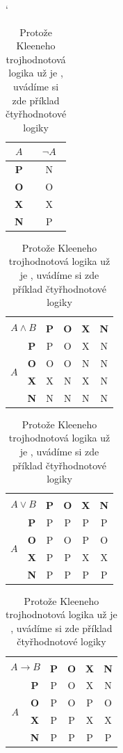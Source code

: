 \documentclass[11pt]{article}
\begin{document}
\begin{table}[h] 
\centering 
\catcode`
\begin{tabular}{|>{\bfseries}c|c|}
    \hline
    $A$ & ${\neg}A$ \\ \hline
     P  &  N        \\ \hline
     O  &  O        \\ \hline
     X  &  X        \\ \hline
     N  &  P        \\ \hline
\end{tabular}
\begin{tabular}{|c|>{\bfseries}c|c|c|c|c|}
    \hline 
    \multicolumn{2}{|c|}{\multirow{2}{*}{$A \land B$}}
     & \multicolumn{4}{|c|}{$B$}                \\ \cline{3-6}
    \multicolumn{2}{|c|}{} & \bfseries P 
     & \bfseries O & \bfseries X & \bfseries N  \\ \hline 
    \multirow{4}{*}{$A$}
     &  P  &  P  &  O  &  X  &  N   \\ \cline{2-6} 
     &  O  &  O  &  O  &  N  &  N   \\ \cline{2-6}
     &  X  &  X  &  N  &  X  &  N   \\ \cline{2-6}
     &  N  &  N  &  N  &  N  &  N   \\ \hline 
\end{tabular}
\begin{tabular}{|c|>{\bfseries}c|c|c|c|c|}
    \hline 
    \multicolumn{2}{|c|}{\multirow{2}{*}{$A \lor B$}}
     &\multicolumn{4}{|c|}{$B$}                 \\ \cline{3-6}
    \multicolumn{2}{|c|}{} & \bfseries P 
     & \bfseries O & \bfseries X & \bfseries N  \\ \hline
    \multirow{4}{*}{$A$}
     &  P  &  P  &  P  &  P  &  P   \\ \cline{2-6} 
     &  O  &  P  &  O  &  P  &  O   \\ \cline{2-6}
     &  X  &  P  &  P  &  X  &  X   \\ \cline{2-6}
     &  N  &  P  &  P  &  P  &  P   \\ \hline 
\end{tabular}
\begin{tabular}{|c|>{\bfseries}c|c|c|c|c|}
    \hline 
    \multicolumn{2}{|c|}{\multirow{2}{*}{$A \rightarrow B$}}
     &\multicolumn{4}{|c|}{$B$}                 \\ \cline{3-6}
    \multicolumn{2}{|c|}{} & \bfseries P 
     & \bfseries O & \bfseries X & \bfseries N  \\ \hline
    \multirow{4}{*}{$A$}
     &  P  &  P  &  O  &  X  &  N   \\ \cline{2-6} 
     &  O  &  P  &  O  &  P  &  O   \\ \cline{2-6}
     &  X  &  P  &  P  &  X  &  X   \\ \cline{2-6}
     &  N  &  P  &  P  &  P  &  P   \\ \hline
\end{tabular}
\caption{Protože Kleeneho trojhodnotová logika už je , uvádíme si zde příklad čtyřhodnotové logiky}
\label{tab2}
\end{table}
\end{document}
